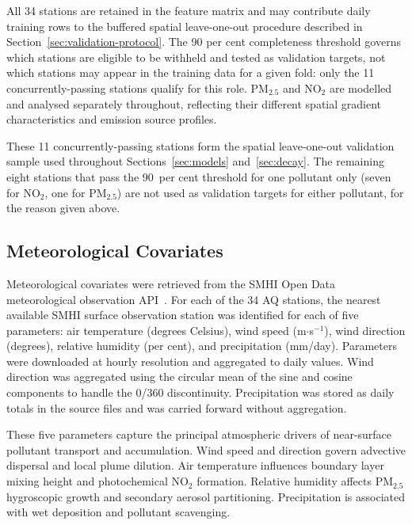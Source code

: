 \documentclass[11pt,a4paper]{article}
\let\oldsubsection\subsection
\renewcommand{\subsection}{\FloatBarrier\oldsubsection}
\begin{document}
All 34 stations are retained in the feature matrix and may contribute daily training rows to the buffered spatial leave-one-out procedure described in Section~\ref{sec:validation-protocol}. The 90 per cent completeness threshold governs which stations are eligible to be withheld and tested as validation targets, not which stations may appear in the training data for a given fold: only the 11 concurrently-passing stations qualify for this role. PM$_{2.5}$ and NO$_2$ are modelled and analysed separately throughout, reflecting their different spatial gradient characteristics and emission source profiles.

These 11 concurrently-passing stations form the spatial leave-one-out validation sample used throughout Sections~\ref{sec:models} and~\ref{sec:decay}. The remaining eight stations that pass the 90~per cent threshold for one pollutant only (seven for NO$_2$, one for PM$_{2.5}$) are not used as validation targets for either pollutant, for the reason given above.

\subsection{Meteorological Covariates}
\label{sec:data-metobs}

Meteorological covariates were retrieved from the SMHI Open Data meteorological observation API~\cite{smhi_metobs}.
For each of the 34 AQ stations, the nearest available SMHI surface observation station was identified for each of five parameters: air temperature (degrees Celsius), wind speed (m$\cdot$s$^{-1}$), wind direction (degrees), relative humidity (per cent), and precipitation (mm/day). Parameters were downloaded at hourly resolution and aggregated to daily values. Wind direction was aggregated using the circular mean of the sine and cosine components to handle the 0\textdegree/360\textdegree{} discontinuity. Precipitation was stored as daily totals in the source files and was carried forward without aggregation.

These five parameters capture the principal atmospheric drivers of near-surface pollutant transport and accumulation. Wind speed and direction govern advective dispersal and local plume dilution. Air temperature influences boundary layer mixing height and photochemical NO$_2$ formation. Relative humidity affects PM$_{2.5}$ hygroscopic growth and secondary aerosol partitioning. Precipitation is associated with wet deposition and pollutant scavenging.
\end{document}
